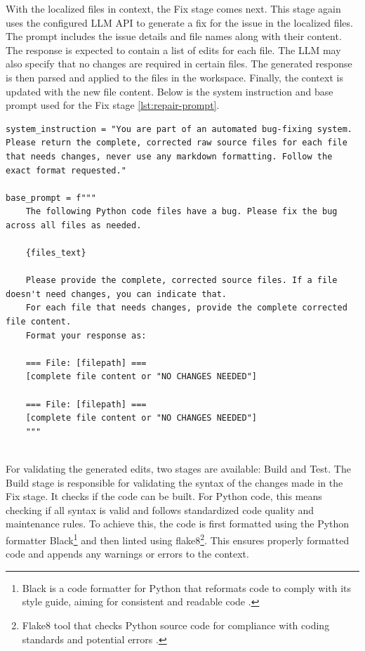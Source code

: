 With the localized files in context, the Fix stage comes next. This stage again uses the configured \ac{LLM} API to generate a fix for the issue in the localized files. The prompt includes the issue details and file names along with their content. The response is expected to contain a list of edits for each file. The \ac{LLM} may also specify that no changes are required in certain files. The generated response is then parsed and applied to the files in the workspace. Finally, the context is updated with the new file content. Below is the system instruction and base prompt used for the Fix stage \ref{lst:repair-prompt}.

\begin{lstlisting}[style=python, caption={Repair Prompt}, label={lst:repair-prompt}]
system_instruction = "You are part of an automated bug-fixing system. Please return the complete, corrected raw source files for each file that needs changes, never use any markdown formatting. Follow the exact format requested."

base_prompt = f"""
    The following Python code files have a bug. Please fix the bug across all files as needed.

    {files_text}

    Please provide the complete, corrected source files. If a file doesn't need changes, you can indicate that.
    For each file that needs changes, provide the complete corrected file content.
    Format your response as:

    === File: [filepath] ===
    [complete file content or "NO CHANGES NEEDED"]

    === File: [filepath] ===
    [complete file content or "NO CHANGES NEEDED"]
    """
    
\end{lstlisting}

For validating the generated edits, two stages are available: Build and Test. The Build stage is responsible for validating the syntax of the changes made in the Fix stage. It checks if the code can be built. For Python code, this means checking if all syntax is valid and follows standardized code quality and maintenance rules. To achieve this, the code is first formatted using the Python formatter Black\footnote{Black is a code formatter for Python that reformats code to comply with its style guide, aiming for consistent and readable code \cite{Black2510Documentation}.} and then linted using flake8\footnote{Flake8 tool that checks Python source code for compliance with coding standards and potential errors \cite{Flake8YourTool}.}. This ensures properly formatted code and appends any warnings or errors to the context.

